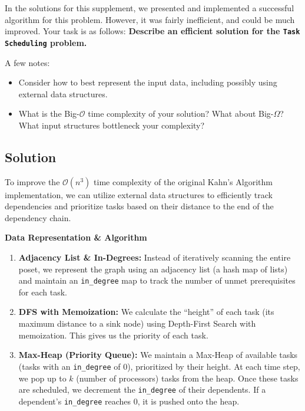 \documentclass{article}
\begin{document}
    In the solutions for this supplement, we presented and implemented a successful algorithm for this problem. However, it was fairly inefficient, and could be much improved. Your task is as follows: \textbf{Describe an efficient solution for the \texttt{Task} \texttt{Scheduling} problem.}

    \vspace{2mm}
    A few notes:
    \begin{itemize}
        \item Consider how to best represent the input data, including possibly using external data structures.
        \item What is the Big-$\mathcal{O}$ time complexity of your solution? What about Big-$\Omega$? What input structures bottleneck your complexity?
    \end{itemize}

\subsection*{Solution}

To improve the $\mathcal{O}(n^3)$ time complexity of the original Kahn's Algorithm implementation, we can utilize external data structures to efficiently track dependencies and prioritize tasks based on their distance to the end of the dependency chain.

\vspace{2mm}
\textbf{Data Representation \& Algorithm}
\begin{enumerate}
    \item \textbf{Adjacency List \& In-Degrees:} Instead of iteratively scanning the entire poset, we represent the graph using an adjacency list (a hash map of lists) and maintain an \texttt{in\_degree} map to track the number of unmet prerequisites for each task.
    \item \textbf{DFS with Memoization:} We calculate the ``height'' of each task (its maximum distance to a sink node) using Depth-First Search with memoization. This gives us the priority of each task.
    \item \textbf{Max-Heap (Priority Queue):} We maintain a Max-Heap of available tasks (tasks with an \texttt{in\_degree} of 0), prioritized by their height. At each time step, we pop up to $k$ (number of processors) tasks from the heap. Once these tasks are scheduled, we decrement the \texttt{in\_degree} of their dependents. If a dependent's \texttt{in\_degree} reaches 0, it is pushed onto the heap.
\end{enumerate}
\end{document}
